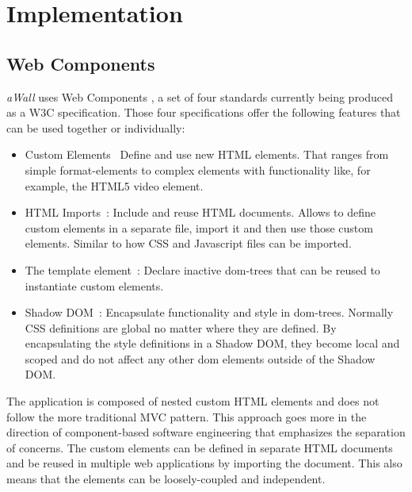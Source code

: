 \documentclass{sigchi}
\begin{document}
\section{Implementation}

\subsection{Web Components}
\textit{aWall} uses Web Components \cite{webcomponents.org}, a set of four standards currently being produced as a W3C specification.
Those four specifications offer the following features that can be used together or individually:
\begin{itemize}
	\item Custom Elements~\cite{CustomElements} Define and use new HTML elements. 
	That ranges from simple format-elements to complex elements with functionality like, for example, the HTML5 video element.
	
	\item HTML Imports~\cite{HTMLImports}: Include and reuse HTML documents.
	Allows to define custom elements in a separate file,  import it and then use those custom elements. 
	Similar to how CSS and Javascript files can be imported.
	
	\item The template element~\cite{TemplateElement}: Declare inactive \gls{dom}-trees that can be reused to instantiate custom elements.
	
	\item Shadow DOM~\cite{ShadowDOM}: Encapsulate functionality and style in \gls{dom}-trees.
	Normally CSS definitions are global no matter where they are defined.
	By encapsulating the style definitions in a Shadow DOM, they become local and scoped and do not affect any other \gls{dom} elements outside of the Shadow DOM.
\end{itemize}

The application is composed of nested custom HTML elements and does not follow the more traditional MVC pattern. 
This approach goes more in the direction of component-based software engineering that emphasizes the separation of concerns.
The custom elements can be defined in separate HTML documents and be reused in multiple web applications by importing the document.
This also means that the elements can be loosely-coupled and independent.

\newpage
\end{document}
